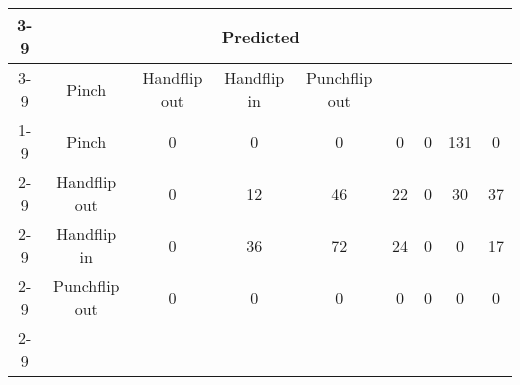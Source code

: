 \documentclass{standalone}
\begin{document}
 
 \begin{tabular}{|c |c |c |c |c |c |c |c |c |}
\cline{3-9}\multicolumn{2}{c|}{} & \multicolumn{7}{c|}{Predicted} \\ 
\cline{3-9} \multicolumn{2}{c |}{ } & Pinch & Handflip out & Handflip in & Punchflip out\\ 
\cline{1-9}\multirow{7}{*}{\rotatebox[origin=c]{90}{Actual}} & Pinch & 0 & 0 & 0 & 0 & 0 & 131 & 0\\ 
 \cline{2-9} & Handflip out & 0 & 12 & 46 & 22 & 0 & 30 & 37\\ 
 \cline{2-9} & Handflip in & 0 & 36 & 72 & 24 & 0 & 0 & 17\\ 
 \cline{2-9} & Punchflip out & 0 & 0 & 0 & 0 & 0 & 0 & 0\\ 
 \cline{2-9}\hline \end{tabular}
 
\end{document}
